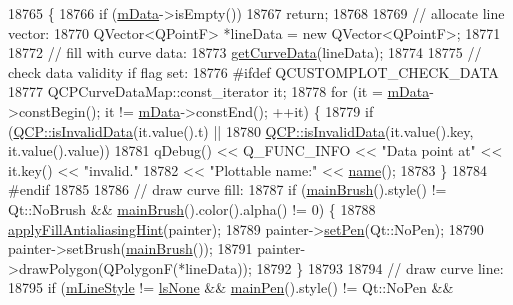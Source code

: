 \begin{DoxyCode}
18765                                        \{
18766   \textcolor{keywordflow}{if} (\hyperlink{class_q_c_p_curve_a88d533e455bca96004b049e99168731b}{mData}->isEmpty())
18767     \textcolor{keywordflow}{return};
18768 
18769   \textcolor{comment}{// allocate line vector:}
18770   QVector<QPointF> *lineData = \textcolor{keyword}{new} QVector<QPointF>;
18771 
18772   \textcolor{comment}{// fill with curve data:}
18773   \hyperlink{class_q_c_p_curve_afa895f8ba9ae34fea6ecea295fd7b1e5}{getCurveData}(lineData);
18774 
18775 \textcolor{comment}{// check data validity if flag set:}
18776 \textcolor{preprocessor}{#ifdef QCUSTOMPLOT\_CHECK\_DATA}
18777   QCPCurveDataMap::const\_iterator it;
18778   \textcolor{keywordflow}{for} (it = \hyperlink{class_q_c_p_curve_a88d533e455bca96004b049e99168731b}{mData}->constBegin(); it != \hyperlink{class_q_c_p_curve_a88d533e455bca96004b049e99168731b}{mData}->constEnd(); ++it) \{
18779     \textcolor{keywordflow}{if} (\hyperlink{namespace_q_c_p_a07ab701c05329089f933b9cae2638a63}{QCP::isInvalidData}(it.value().t) ||
18780         \hyperlink{namespace_q_c_p_a07ab701c05329089f933b9cae2638a63}{QCP::isInvalidData}(it.value().key, it.value().value))
18781       qDebug() << Q\_FUNC\_INFO << \textcolor{stringliteral}{"Data point at"} << it.key() << \textcolor{stringliteral}{"invalid."}
18782                << \textcolor{stringliteral}{"Plottable name:"} << \hyperlink{class_q_c_p_abstract_plottable_a1affc1972938e4364a9325e4e4e4dcea}{name}();
18783   \}
18784 \textcolor{preprocessor}{#endif}
18785 
18786   \textcolor{comment}{// draw curve fill:}
18787   \textcolor{keywordflow}{if} (\hyperlink{class_q_c_p_abstract_plottable_ae74c123832da180c17e22203e748d9b7}{mainBrush}().style() != Qt::NoBrush && \hyperlink{class_q_c_p_abstract_plottable_ae74c123832da180c17e22203e748d9b7}{mainBrush}().color().alpha() != 0) \{
18788     \hyperlink{class_q_c_p_abstract_plottable_ac08a480155895e674dbfe5a5670e0ff3}{applyFillAntialiasingHint}(painter);
18789     painter->\hyperlink{class_q_c_p_painter_af9c7a4cd1791403901f8c5b82a150195}{setPen}(Qt::NoPen);
18790     painter->setBrush(\hyperlink{class_q_c_p_abstract_plottable_ae74c123832da180c17e22203e748d9b7}{mainBrush}());
18791     painter->drawPolygon(QPolygonF(*lineData));
18792   \}
18793 
18794   \textcolor{comment}{// draw curve line:}
18795   \textcolor{keywordflow}{if} (\hyperlink{class_q_c_p_curve_ae1f35ae2b15aee8e15bcdfec5be95156}{mLineStyle} != \hyperlink{class_q_c_p_curve_a2710e9f79302152cff794c6e16cc01f1aec1601a191cdf0b4e761c4c66092cc48}{lsNone} && \hyperlink{class_q_c_p_abstract_plottable_a19276ed2382a3a06464417b8788b1451}{mainPen}().style() != Qt::NoPen &&

\end{DoxyCode}
